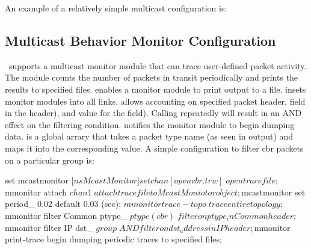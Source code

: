 An example of a relatively simple multicast configuration is:

\subsection{Multicast Behavior Monitor Configuration}
\ns\ supports a multicast monitor module that can trace
user-defined packet activity.
The module counts the number of packets in transit periodically
and prints the results to specified files.  enables a 
monitor module to print output to a file. 
 insets monitor modules into all links. 
 allows accounting on specified packet header, 
field in the header), and value for the field).  Calling 
repeatedly will result in an AND effect on the filtering condition.
 notifies the monitor module to begin dumping data.
 is a global arrary that takes a packet type name (as seen in
 output) and maps it into the corresponding value.  
A simple configuration to filter cbr packets on a particular group is:

\begin{program}
        set mcastmonitor [$ns McastMonitor]
        set chan [open cbr.tr w] \; open trace file;
        $mmonitor attach $chan1  \; attach trace file to McastMoniotor object;
        $mcastmonitor set period_ 0.02         \; default 0.03 (sec);
        $mmonitor trace-topo   \; trace entire topology;
        $mmonitor filter Common ptype_ $ptype(cbr) \; filter on ptype_ in Common header;
        $mmonitor filter IP dst_ $group \; AND filter on dst_ address in IP header;
        $mmonitor print-trace  \; begin dumping periodic traces to specified files;

\end{program} %

